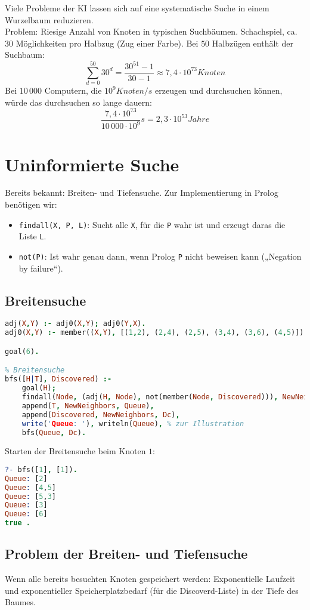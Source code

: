 Viele Probleme der KI lassen sich auf eine systematische Suche in einem Wurzelbaum reduzieren. \\
Problem: Riesige Anzahl von Knoten in typischen Suchbäumen. 
 Schachspiel, ca. $30$ Möglichkeiten pro Halbzug (Zug einer Farbe). Bei $50$ Halbzügen enthält der Suchbaum:
$$\sum_{d=0}^{50} 30^d = \frac{30^{51}-1}{30-1} \approx 7,4 \cdot 10^{73}\unit{Knoten}$$
Bei $10\, 000$ Computern, die $10^9 \unit{Knoten/s}$ erzeugen und durchsuchen können, würde das durchsuchen so lange dauern:
$$ \frac{7,4 \cdot 10^{73}}{10\,000 \cdot 10^9}\unit{s}=2,3 \cdot 10^{53} \unit{Jahre}$$

\section{Uninformierte Suche}
Bereits bekannt: Breiten- und Tiefensuche. Zur Implementierung in Prolog benötigen wir:
\begin{itemize}
\item \lstinline`findall(X, P, L)`: Sucht alle \lstinline`X`, für die \lstinline`P` wahr ist und erzeugt daras die Liste \lstinline`L`.
\item \lstinline`not(P)`: Ist wahr genau dann, wenn Prolog \lstinline`P` nicht beweisen kann („Negation by failure“).
\end{itemize}
\subsection{Breitensuche}
\begin{lstlisting}[language=Prolog]
% Adjazenzrelation des ungerichteten Graphen (nicht effizient)
adj(X,Y) :- adj0(X,Y); adj0(Y,X).
adj0(X,Y) :- member((X,Y), [(1,2), (2,4), (2,5), (3,4), (3,6), (4,5)]).

goal(6).

% Breitensuche
bfs([H|T], Discovered) :-
	goal(H);
	findall(Node, (adj(H, Node), not(member(Node, Discovered))), NewNeighbors),
	append(T, NewNeighbors, Queue),
	append(Discovered, NewNeighbors, Dc),
	write('Queue: '), writeln(Queue), % zur Illustration
	bfs(Queue, Dc).
\end{lstlisting}

Starten der Breitensuche beim Knoten $1$:
\begin{lstlisting}[language=Prolog]
?- bfs([1], [1]).
Queue: [2]
Queue: [4,5]
Queue: [5,3]
Queue: [3]
Queue: [6]
true .
\end{lstlisting}
\subsection{Problem der Breiten- und Tiefensuche} 
Wenn alle bereits besuchten Knoten gespeichert werden: Exponentielle Laufzeit und exponentieller Speicherplatzbedarf (für die Discoverd-Liste) in der Tiefe des Baumes.
